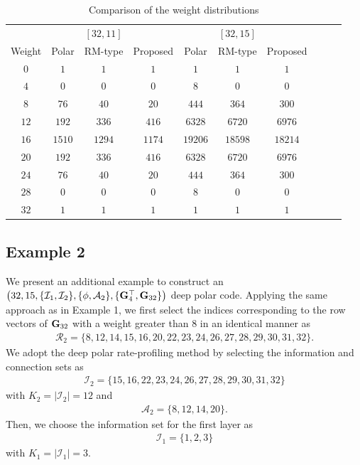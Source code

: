 \documentclass[conference]{IEEEtran}
\begin{document}
\begin{table}
\centering
\caption{Comparison of the weight distributions }\label{table:WD}
\begin{tabular}{c|ccc|cccccc}
\toprule
{} & {} & $[32,11]$ & {} & {} & $[32,15]$  & {} \\ 
\cmidrule(lr){1-1}\cmidrule(lr){2-4}\cmidrule(lr){5-7}
{Weight} & Polar & RM-type & Proposed & Polar & RM-type & Proposed \\ 
\midrule
$0$  &  $1$        &  $1$     &  $1$          & $1$           &  $1$            &  $1$\\
$4$  &  $0$        &  $0$     &  $0$          & $8$           &  $0$            &  $0$\\
$8$  & $76$       &  $40$   &  $20$        & $444$       &  $364$        &  $300$\\
$12$ & $192$     &  $336$  &  $416$      & $6328$     &  $6720$      &  $6976$\\
$16$ &  $1510$  &  $1294$ &  $1174$    & $19206$   &  $18598$    &  $18214$\\ 
$20$ & $192$     &  $336$  &  $416$       & $6328$    &  $6720$      &  $6976$\\  
$24$ & $76$       &  $40$    &  $20$        & $444$       &  $364$       &  $300$\\
$28$ & $0$         &  $0$     &  $0$           & $8$          &  $0$           &  $0$\\
$32$ & $1$         &  $1$     &  $1$           & $1$          &  $1$           &  $1$\\
\bottomrule
\end{tabular}
\end{table}
 
 
\subsection{Example 2}
We present an additional example to construct an $\left(32,15, \{\mathcal{I}_1, \mathcal{I}_2\}, \{\phi, \mathcal{A}_2\}, \{{\bf G}_{4}^{\top}, {\bf G}_{32}\}\right)$ deep polar code. Applying the same approach as in Example 1, we first select the indices corresponding to the row vectors of ${\bf G}_{32}$ with a weight greater than 8 in an identical manner as  \begin{align}
 	\mathcal{R}_{2}=\{8,12,14,15,16,20,22,23,24,26,27,28,29,30,31,32\}.\nonumber
 \end{align}
We adopt the deep polar rate-profiling method by selecting the information and connection sets as
\begin{align}
	\mathcal{I}_2=\{15,16,22,23,24,26,27,28,29,30,31,32\}\nonumber
\end{align}
with $K_2=|\mathcal{I}_2|=12$
and
\begin{align}
	\mathcal{A}_2=\{8,12,14,20\}.\nonumber
\end{align}
Then, we choose the information set for the first layer as
\begin{align}
	\mathcal{I}_1=\{1,2,3\}\nonumber
\end{align}
with $K_1=|\mathcal{I}_{1}|  =3$. 
\end{document}
